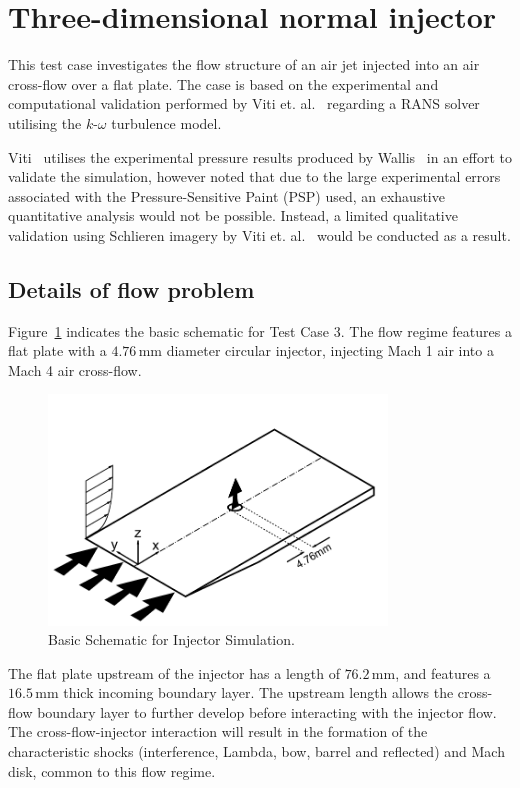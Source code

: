 \newpage
\section{Three-dimensional normal injector}
\label{chapter-3Dinjector}
%
This test case investigates the flow structure of an air jet injected into an air cross-flow over a flat plate. The case is based on the experimental and computational validation performed by Viti et. al.~\cite{schetz2009} regarding a RANS solver utilising the $k$-$\omega$ turbulence model. 

Viti~\cite{schetz2009} utilises the experimental pressure results produced by Wallis~\cite{wallis2001} in an effort to validate the simulation, however noted that due to the large experimental errors associated with the Pressure-Sensitive Paint (PSP) used, an exhaustive quantitative analysis would not be possible. Instead, a limited qualitative validation using Schlieren imagery by Viti et. al.~\cite{viti2004} would be conducted as a result.

\subsection{Details of flow problem}
Figure~\ref{f:tc3:scheme} indicates the basic schematic for Test Case 3. The flow regime features a flat plate with a $4.76$\,mm diameter circular injector, injecting Mach 1 air into a Mach 4 air cross-flow. 
%
\begin{figure}[htbp]
 \begin{center}
  \includegraphics[width=9cm]{./chap8-3Dinjector/figs/inject-schematic.pdf}
  \caption{Basic Schematic for Injector Simulation.}
  \label{f:tc3:scheme}
 \end{center}
\end{figure}
%
The flat plate upstream of the injector has a length of $76.2$\,mm, and features a $16.5$\,mm thick incoming boundary layer. The upstream length allows the cross-flow boundary layer to further develop before interacting with the injector flow. The cross-flow-injector interaction will result in the formation of the characteristic shocks (interference, Lambda, bow, barrel and reflected) and Mach disk, common to this flow regime.

